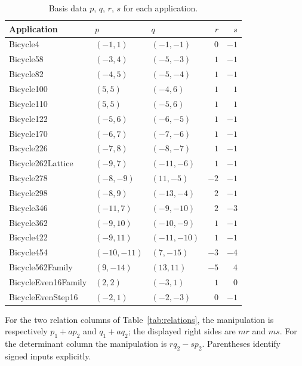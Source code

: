 \documentclass{article}
\begin{document}
\begin{table}[htbp]
  \centering
  \caption{Basis data \(p\), \(q\), \(r\), \(s\) for each application.}
  \label{tab:basis}
  \begin{tabular}{lllrr}
    Application & \(p\) & \(q\) & \(r\) & \(s\) \\
    \hline
    Bicycle4 & \((-1, 1)\) & \((-1, -1)\) & \(0\) & \(-1\) \\
    Bicycle58 & \((-3, 4)\) & \((-5, -3)\) & \(1\) & \(-1\) \\
    Bicycle82 & \((-4, 5)\) & \((-5, -4)\) & \(1\) & \(-1\) \\
    Bicycle100 & \((5, 5)\) & \((-4, 6)\) & \(1\) & \(1\) \\
    Bicycle110 & \((5, 5)\) & \((-5, 6)\) & \(1\) & \(1\) \\
    Bicycle122 & \((-5, 6)\) & \((-6, -5)\) & \(1\) & \(-1\) \\
    Bicycle170 & \((-6, 7)\) & \((-7, -6)\) & \(1\) & \(-1\) \\
    Bicycle226 & \((-7, 8)\) & \((-8, -7)\) & \(1\) & \(-1\) \\
    Bicycle262Lattice & \((-9, 7)\) & \((-11, -6)\) & \(1\) & \(-1\) \\
    Bicycle278 & \((-8, -9)\) & \((11, -5)\) & \(-2\) & \(-1\) \\
    Bicycle298 & \((-8, 9)\) & \((-13, -4)\) & \(2\) & \(-1\) \\
    Bicycle346 & \((-11, 7)\) & \((-9, -10)\) & \(2\) & \(-3\) \\
    Bicycle362 & \((-9, 10)\) & \((-10, -9)\) & \(1\) & \(-1\) \\
    Bicycle422 & \((-9, 11)\) & \((-11, -10)\) & \(1\) & \(-1\) \\
    Bicycle454 & \((-10, -11)\) & \((7, -15)\) & \(-3\) & \(-4\) \\
    Bicycle562Family & \((9, -14)\) & \((13, 11)\) & \(-5\) & \(4\) \\
    BicycleEven16Family & \((2, 2)\) & \((-3, 1)\) & \(1\) & \(0\) \\
    BicycleEvenStep16 & \((-2, 1)\) & \((-2, -3)\) & \(0\) & \(-1\) \\
  \end{tabular}
\end{table}

For the two relation columns of Table~\ref{tab:relations}, the manipulation is respectively
\(p_1+ap_2\) and \(q_1+aq_2\); the displayed right sides are \(mr\) and \(ms\).
For the determinant column the manipulation is \(rq_2-sp_2\).
Parentheses identify signed inputs explicitly.
\end{document}

